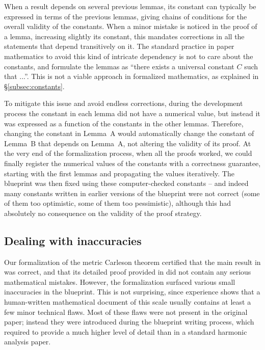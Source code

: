 \documentclass[12pt]{amsart}
\theoremstyle{definition}
\theoremstyle{plain}
\begin{document}
When a result depends on several previous lemmas, its constant can typically
be expressed in terms of the previous lemmas, giving chains of conditions for
the overall validity of the constants. When a minor mistake is noticed in the
proof of a lemma, increasing slightly its constant, this mandates corrections
in all the statements that depend transitively on it. The standard practice
in paper mathematics to avoid this kind of intricate dependency is not to
care about the constants, and formulate the lemmas as ``there exists a
universal constant $C$ such that ...''. This is not a viable approach in
formalized mathematics, as explained in \S\ref{subsec:constants}.

To mitigate this issue and avoid endless corrections, during the development
process the constant in each lemma did not have a numerical value, but
instead it was expressed as a function of the constants in the other lemmas.
Therefore, changing the constant in Lemma~A would automatically change the
constant of Lemma~B that depends on Lemma~A, not altering the validity of its
proof. At the very end of the formalization process, when all the proofs
worked, we could finally register the numerical values of the constants with
a correctness guarantee, starting with the first lemmas and propagating the
values iteratively. The blueprint was then fixed using these computer-checked
constants -- and indeed many constants written in earlier versions of the
blueprint were not correct (some of them too optimistic, some of them too
pessimistic), although this had absolutely no consequence on the validity of
the proof strategy.


\subsection{Dealing with inaccuracies}\label{subsec:blueprint_mistakes}

Our formalization of the metric Carleson theorem certified that the main result in \cite{ThieleCarlesonPreprint} was correct, and that its detailed proof provided in \cite{CarlesonBlueprint} did not contain any serious mathematical mistakes. However, the formalization surfaced various small inaccuracies in the blueprint.  This is not surprising, since experience shows that a human-written mathematical document of this scale usually contains at least a few minor technical flaws.
Most of these flaws were not present in the original paper; instead they were introduced during the blueprint writing process, which required to provide a much higher level of detail than in a standard harmonic analysis paper.
\end{document}
